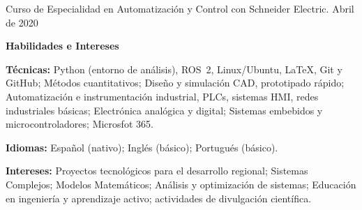 \documentclass[11pt]{article}
\begin{document}
	Curso de Especialidad en Automatización y Control con Schneider Electric. \hfill Abril de 2020
		
	\begin{center}
		\textbf{Habilidades e Intereses}
	\end{center}
	
	\textbf{Técnicas:} Python (entorno de análisis), ROS~2, Linux/Ubuntu, LaTeX, Git y GitHub; Métodos cuantitativos; Diseño y simulación CAD, prototipado rápido; Automatización e instrumentación industrial, PLCs, sistemas HMI, redes industriales básicas; Electrónica analógica y digital; Sistemas embebidos y microcontroladores; Microsfot 365.
	
	\vspace{4pt}
	
	\textbf{Idiomas:} Español (nativo); Inglés (básico); Portugués (básico).
	
	\vspace{4pt}
	
	\textbf{Intereses:} Proyectos tecnológicos para el desarrollo regional; Sistemas Complejos; Modelos Matemáticos; Análisis y optimización de sistemas; Educación en ingeniería y aprendizaje activo; actividades de divulgación científica.
	
	
\end{document}
